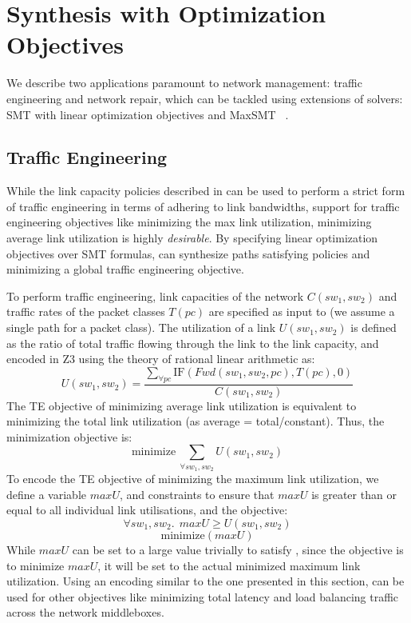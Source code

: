 \section{Synthesis with Optimization Objectives}
We describe two applications paramount to network management:
traffic engineering and network repair, which can be tackled using
extensions of solvers: SMT with linear optimization objectives and MaxSMT ~\cite{}.
\subsection{Traffic Engineering}
While the link capacity policies described in  can
be used to perform a strict form of traffic engineering in terms of 
adhering to link bandwidths, support for traffic engineering objectives
like minimizing the max link utilization, minimizing average link utilization
is highly \emph{desirable}. By specifying linear optimization objectives over
SMT formulas, \name can synthesize paths satisfying policies and minimizing
a global traffic engineering objective. 

To perform traffic engineering, link capacities of the network $C(sw_1, sw_2)$ and traffic 
rates of the packet classes $T(pc)$ are specified as input to \name (we assume a single
path for a packet class). The utilization 
of a link $U(sw_1, sw_2)$ is defined as the ratio of total traffic flowing through the link to the 
link capacity, and encoded in Z3 using the theory of rational linear arithmetic as:
\begin{equation}
U(sw_1, sw_2) = \frac{\sum_{\forall pc} \text{IF}(Fwd(sw_1,sw_2, pc), T(pc), 0)} {C(sw_1, sw_2)}
\end{equation}
The TE objective of minimizing average link utilization is equivalent to minimizing
the total link utilization (as average = total/constant). Thus, the minimization
objective is:
\begin{equation}
	\text{minimize}\ \sum_{\forall sw_1, sw_2} U(sw_1, sw_2)
\end{equation}
To encode the TE objective of minimizing the maximum link utilization, we define
a variable $maxU$, and constraints to ensure that $maxU$ is greater than or equal to all 
individual link utilisations, and the objective: 
\begin{equation} \label{eq:maxu}
\forall sw_1, sw_2.\ \ maxU \geq U(sw_1, sw_2)
\end{equation} 
\begin{equation}
		\text{minimize}(maxU)
\end{equation}
While $maxU$ can be set to a large value trivially to satisfy 
, since the objective is to minimize $maxU$, it will be set to the actual
minimized maximum link utilization. Using an encoding similar to the one presented in this section, \name can be used for other objectives like minimizing total latency and load balancing
traffic across the network middleboxes.

